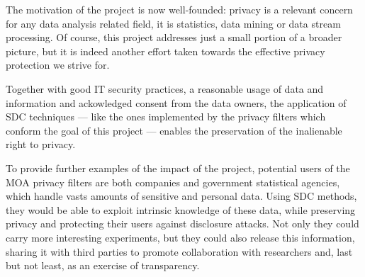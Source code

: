 The motivation of the project is now well-founded: privacy is a relevant concern for any data analysis related field, it is statistics, data mining or data stream processing. Of course, this project addresses just a small portion of a broader picture, but it is indeed another effort taken towards the effective privacy protection we strive for.

Together with good IT security practices, a reasonable usage of data and information and ackowledged consent from the data owners, the application of SDC techniques --- like the ones implemented by the privacy filters which conform the goal of this project --- enables the preservation of the inalienable right to privacy.

To provide further examples of the impact of the project, potential users of the MOA privacy filters are both companies and government statistical agencies, which handle vasts amounts of sensitive and personal data. Using SDC methods, they would be able to exploit intrinsic knowledge of these data, while preserving privacy and protecting their users against disclosure attacks. Not only they could carry more interesting experiments, but they could also release this information, sharing it with third parties to promote collaboration with researchers and, last but not least, as an exercise of transparency.
